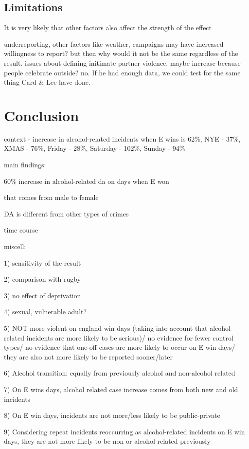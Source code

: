 \documentclass[12pt, letterpaper]{article}
\begin{document}
\subsection{Limitations}

It is very likely that other factors also affect the strength of the effect

underreporting, other factors like weather, campaigns may have increased willingness to report? but then why would it not be the same regardless of the result. issues about defining initimate partner violence, maybe increase because people celebrate outside? no.
If he had enough data, we could test for the same thing Card \& Lee have done.


\section{Conclusion}

context - increase in alcohol-related incidents when E wins is 62\%, NYE - 37\%, XMAS - 76\%, Friday - 28\%, Saturday - 102\%, Sunday - 94\%


main findings:

60\% increase in alcohol-related da on days when E won

that comes from male to female

DA is different from other types of crimes

time course

miscell:

1) sensitivity of the result

2) comparison with rugby 

3) no effect of deprivation

4) sexual, vulnerable adult?

5) NOT more violent on england win days (taking into account that alcohol related incidents are more likely to be serious)/ no evidence for fewer control types/ no evidence that one-off cases are more likely to occur on E win days/ they are also not more likely to be reported sooner/later

6) Alcohol transition: equally from previously alcohol and non-alcohol related

7) On E wins days, alcohol related case increase comes from both new and old incidents

8) On E win days, incidents are not more/less likely to be public-private

9) Considering repeat incidents reoccurring as alcohol-related incidents on E win days, they are not more likely to be non or alcohol-related previously
\end{document}
